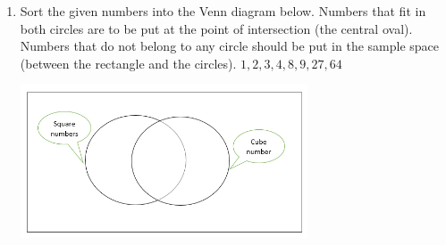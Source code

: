 \documentclass{article}
\begin{document}
\begin{enumerate}
\item \quad Sort the given numbers into the Venn diagram below. Numbers that fit in both circles are to be put at the point of intersection (the central oval). Numbers that do not belong to any circle should be put in the sample space (between the rectangle and the circles).\hspace{1cm} \( { 1, 2, 3, 4, 8, 9, 27, 64 } \)
\begin{center}
\includegraphics[width=8.5cm]{Year_6_Mixed_Tests/Homework_Tasks/Venn_sq_cb.png}
\end{center}


\end{enumerate}




\end{document}

